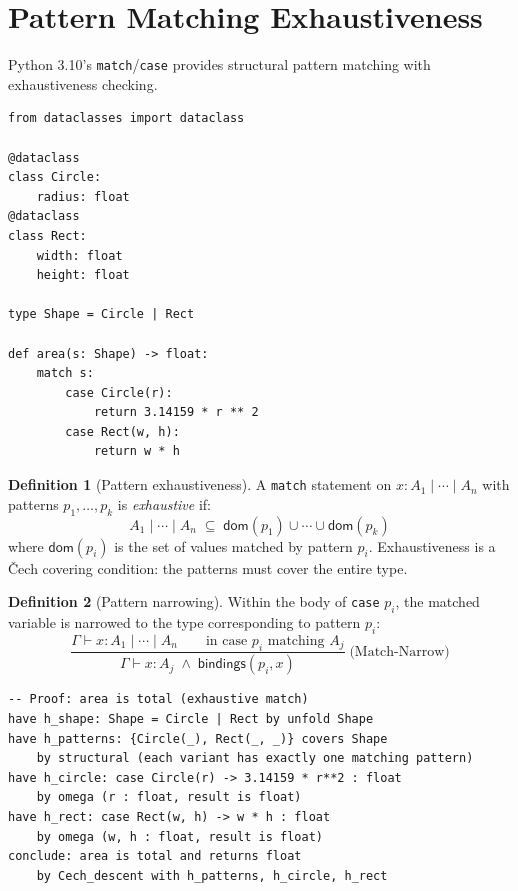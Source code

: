 \documentclass[11pt,a4paper]{report}
\theoremstyle{definition}
\newtheorem{definition}{Definition}[chapter]
\theoremstyle{plain}
\begin{document}
\section{Pattern Matching Exhaustiveness}

Python 3.10's \texttt{match}/\texttt{case} provides structural pattern
matching with exhaustiveness checking.

\begin{lstlisting}[style=python]
from dataclasses import dataclass

@dataclass
class Circle:
    radius: float
@dataclass
class Rect:
    width: float
    height: float

type Shape = Circle | Rect

def area(s: Shape) -> float:
    match s:
        case Circle(r):
            return 3.14159 * r ** 2
        case Rect(w, h):
            return w * h
\end{lstlisting}

\begin{definition}[Pattern exhaustiveness]
A \texttt{match} statement on $x : A_1 \mid \cdots \mid A_n$ with patterns
$p_1, \ldots, p_k$ is \emph{exhaustive} if:
\[
  A_1 \mid \cdots \mid A_n \;\subseteq\;
  \mathsf{dom}(p_1) \cup \cdots \cup \mathsf{dom}(p_k)
\]
where $\mathsf{dom}(p_i)$ is the set of values matched by pattern $p_i$.
Exhaustiveness is a \v{C}ech covering condition: the patterns must cover
the entire type.
\end{definition}

\begin{definition}[Pattern narrowing]
Within the body of \texttt{case} $p_i$, the matched variable is narrowed
to the type corresponding to pattern $p_i$:
\[
  \frac{
    \Gamma \vdash x : A_1 \mid \cdots \mid A_n \qquad
    \text{in case } p_i \text{ matching } A_j
  }{
    \Gamma \vdash x : A_j \;\wedge\; \mathsf{bindings}(p_i, x)
  }
  \;\text{(Match-Narrow)}
\]
\end{definition}

\begin{lstlisting}[style=proof]
-- Proof: area is total (exhaustive match)
have h_shape: Shape = Circle | Rect by unfold Shape
have h_patterns: {Circle(_), Rect(_, _)} covers Shape
    by structural (each variant has exactly one matching pattern)
have h_circle: case Circle(r) -> 3.14159 * r**2 : float
    by omega (r : float, result is float)
have h_rect: case Rect(w, h) -> w * h : float
    by omega (w, h : float, result is float)
conclude: area is total and returns float
    by Cech_descent with h_patterns, h_circle, h_rect
\end{lstlisting}
\end{document}
